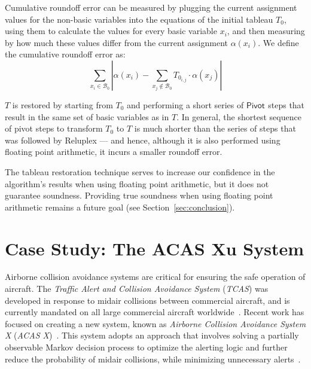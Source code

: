 \documentclass[a4paper]{llncs}
\newcommand{\basic}{\mathcal{B}}
\newcommand{\assignment}{\alpha{}}
\newcommand{\irulename}[2]{\ensuremath{\mathsf{#1}_{#2}}\xspace}
\newcommand{\pivot}[1]{\irulename{Pivot}{#1}}
\begin{document}
Cumulative roundoff error can be measured by plugging the
current assignment values for the non-basic variables into the equations 
of the initial tableau $T_0$, 
 using them to calculate the values for every basic variable $x_i$, and then
 measuring by how much these values differ from the 
 current assignment $\assignment(x_i)$. We define the cumulative
 roundoff error as:
\[
 \sum_{x_i\in\basic{}_0} |\assignment(x_i) - \sum_{x_j\notin\basic_0}
 T_{0_{i,j}} \cdot \assignment(x_j)|
\]

 $T$ is restored by starting from 
 $T_0$
and performing a short series of \pivot{} steps that result in the same set of
basic variables as in $T$. 
In general, the shortest sequence of pivot steps to transform $T_0$ to $T$
is much shorter than the series of steps that was followed by
Reluplex --- and hence, although it is also performed using floating
point arithmetic,
it incurs a  
smaller roundoff error. 

The tableau restoration technique serves to increase our confidence in
the algorithm's results when using floating point arithmetic, but it
does not guarantee soundness. Providing true soundness when using
floating point arithmetic remains a future goal (see
Section~\ref{sec:conclusion}).

\section{Case Study: The ACAS Xu System}
\label{sec:acasxu}

Airborne collision avoidance systems are critical for ensuring the
safe operation of aircraft. The \emph{Traffic Alert and Collision Avoidance System}
(\emph{TCAS}) was developed in response to midair collisions between
commercial aircraft, and is currently mandated on all 
large commercial aircraft worldwide~\cite{Kuchar2007}. 
Recent work has focused on creating
a new system, known as \emph{Airborne Collision Avoidance System X}
(\emph{ACAS X})~\cite{DMU2015,Kochenderfer2011atc371}. This system adopts an approach that involves solving
a partially observable Markov decision process to optimize the
alerting logic and further reduce the probability of midair
collisions, while minimizing unnecessary
alerts~\cite{DMU2015,Kochenderfer2011atc371,Kochenderfer2012lljournal}.   
\end{document}
